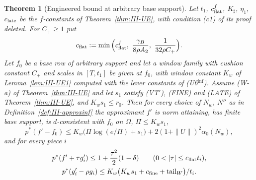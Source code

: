 \documentclass[10pt]{amsart}
\newtheorem{theorem}{Theorem}[section]
\theoremstyle{definition}
\theoremstyle{remark}
\begin{document}
\begin{theorem}[Engineered bound at arbitrary base support]\label{thm:III-UEinf}
Let $t_1$, $c^f_{\rm flat}$, $K_\sharp$, $\eta_1$, $c_{\rm late}$ be the
$f$-constants of Theorem~\textup{\ref{thm:III-UE}}, with condition \textup{(c1)}
of its proof deleted.  For $C_+\ge1$ put
\[
 c_{\rm flat}:=\min\Big(c^f_{\rm flat},\ \frac{\gamma_B}{8\rho A_2},\
 \frac1{32\rho C_+}\Big).
\]
Let $f_0$ be a base row of arbitrary support and let a window family with
cushion constant $C_+$ and scales in $[T,t_1]$ be given at $f_0$, with window
constant $K_w$ of Lemma~\textup{\ref{lem:III-UE1}} computed with the lever
constants of \textup{(U6$^{\inf}$)}.  Assume \textup{(W-a)} of
Theorem~\textup{\ref{thm:III-UE}} and let $s_1$ satisfy \textup{(VT$'$)},
\textup{(FINE)} and \textup{(LATE)} of Theorem~\textup{\ref{thm:III-UE}}, and
$K_w s_1\le r_0$.  Then for every choice of $N_w$, $N''$ as in
Definition~\textup{\ref{def:III-approxinf}} the approximant $f'$ is norm
attaining, has finite base support, is $d$-consistent with $f_0$ on $\Omega$,
$\Pi\le K_ws_1$,
\[
 p^*(f'-f_0)\le K_w\big(\Pi\log(e/\Pi)+s_1\big)+2(1+\|U\|)^2\alpha_0(N_w),
\]
and for every piece $i$
\begin{gather*}
 p^*(f'+\tau g'_i)\le1+\frac{\tau^2}2(1-\delta)\qquad(0<|\tau|\le c_{\rm flat}
 t_i),\\
 p^*(g'_i-\rho g_i)\le K_w\big(K_ws_1+c_{\rm fine}+\mathrm{tail}_W\big)/t_i .
\end{gather*}
\end{theorem}
\end{document}
